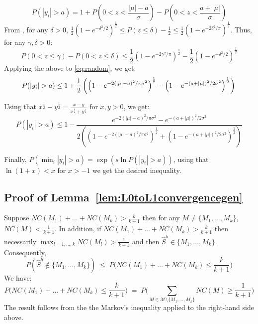 \documentclass[aos]{imsart}
\theoremstyle{plain}
\newcommand{\M}{\mathcal{M}}
\begin{document}
\begin{equation}\label{eq:random}
    P(|y_i|>a) = 1+P(0<z<\frac{|\mu|-a}{\sigma})-P(0<z<\frac{a+|\mu|}{\sigma})
\end{equation}
From \cite{chu}, for any $\delta>0$, $\frac{1}{2}\left(1-e^{-\delta^2/2}\right)^{\frac{1}{2}}\leq P(z \leq \delta)-\frac{1}{2}\leq \frac{1}{2}\left(1-e^{-2\delta^2/\pi}\right)^{\frac{1}{2}}$. Thus, for any $\gamma,\delta>0$:
$$ P(0<z \leq \gamma)-P(0<z \leq \delta)\leq
\frac{1}{2}\left(1-e^{-2\gamma^2/\pi}\right)^{\frac{1}{2}}-\frac{1}{2}\left(1-e^{-\delta^2/2}\right)^{\frac{1}{2}}$$
Applying the above to \eqref{eq:random}, we get:
$$P(|y_i|>a) \leq 
1+ \frac{1}{2}\left(\left(1-e^{-2(|\mu|-a)^2/\pi\sigma^2}\right)^{\frac{1}{2}}-\left(1-e^{-(a+|\mu|)^2/2\sigma^2}\right)^{\frac{1}{2}}\right)\\$$

Using that $x^{\frac{1}{2}}-y^{\frac{1}{2}}=\frac{x-y}{x^{\frac{1}{2}}+y^{\frac{1}{2}}}$ for $x,y>0$, we get:
$$P(|y_i|>a) \leq 1- \frac{e^{-2(|\mu|-a)^2/\pi\sigma^2}-e^{-(a+|\mu|)^2/2\sigma^2}}{2\left(\left(1-e^{-2(|\mu|-a)^2/\pi\sigma^2}\right)^{\frac{1}{2}}+\left(1-e^{-(a+|\mu|)^2/2\sigma^2}\right)^{\frac{1}{2}}\right)}$$

Finally, $P(\min_{i}|y_i|>a)=\exp\left(s\ln{P(|y_i|>a)}\right)$, using that $\ln\left(1+ x \right)< x$ for $x>-1$ we get the desired inequality.

\subsection{Proof of Lemma~\ref{lem:L0toL1convergencegen}}
Suppose $NC(M_1)+\ldots+NC(M_k)>\frac{k}{k+1}$ then for any $M\neq \{M_1,\ldots,M_k\}$, $NC(M)<\frac{1}{k+1}$. In addition, if $NC(M_1)+\ldots+NC(M_k)>\frac{k}{k+1}$ then necessarily $\max_{l=1,\ldots,k}NC(M_l)> \frac{1}{k+1}$ and then $\hat{S}^{b}\in \{M_1,\ldots,M_k\}$. Consequently, 
$$
P(\hat{S}^b\not\in \{M_1,\ldots,M_k\})\; \leq\; P\Big(NC(M_1)+\ldots+NC(M_k)\leq\frac{k}{k+1}\Big)$$
We have:
$$P\Big(NC(M_1)+\ldots+NC(M_k)\leq\frac{k}{k+1}\Big)\;=\;P\Big(\sum_{M \in \M\setminus \{M_1,\ldots,M_k\}} NC(M)\geq \frac{1}{k+1}\Big)$$
The result follows from the the Markov's inequality applied to the right-hand side above.
\end{document}
